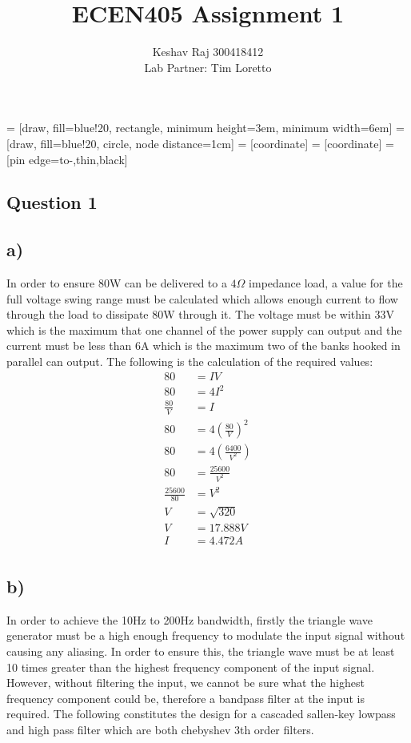 \documentclass[]{article}
\title{ECEN405 Assignment 1}
\author{Keshav Raj 300418412\\Lab Partner: Tim Loretto}
\begin{document}
 = [draw, fill=blue!20, rectangle, 
minimum height=3em, minimum width=6em]
 = [draw, fill=blue!20, circle, node distance=1cm]
 = [coordinate]
 = [coordinate]
 = [pin edge={to-,thin,black}]
\maketitle


\begin{multicols}{2}
	\section{Question 1}
	\subsection{a)}
	In order to ensure 80W can be delivered to a $4\Omega$ impedance load, a value for the full voltage swing range must be calculated which allows enough current to flow through the load to dissipate 80W through it. The voltage must be within 33V which is the maximum that one channel of the power supply can output and the current must be less than 6A which is the maximum two of the banks hooked in parallel can output.
	The following is the calculation of the required values:
	\begin{equation*}
	\begin{split}
	80&=IV\\
	80&=4I^2\\
	\frac{80}{V}&=I\\
	80&=4\left( \frac{80}{V} \right)^2\\
	80&=4\left( \frac{6400}{V^2} \right)\\
	80&=\frac{25600}{V^2}\\
	\frac{25600}{80}&=V^2\\
	V&=\sqrt{320}\\
	V&=17.888V\\
	I&=4.472A\\  
	\end{split}
	\end{equation*}
	\subsection{b)}
	In order to achieve the 10Hz to 200Hz bandwidth, firstly the triangle wave generator must be a high enough frequency to modulate the input signal without causing any aliasing. In order to ensure this, the triangle wave must be at least 10 times greater than the highest frequency component of the input signal. However, without filtering the input, we cannot be sure what the highest frequency component could be, therefore a bandpass filter at the input is required. The following constitutes the design for a cascaded sallen-key lowpass and high pass filter which are both chebyshev 3th order filters.
\end{multicols}
\end{document}
